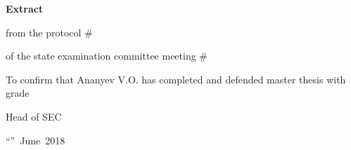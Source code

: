 \begin{titlepage}
    \fontsize{12}{12}\selectfont

    \vspace*{6cm}

    \begin{center}
        \textbf{Extract}

        from the protocol \#

        of the state examination committee meeting \#
    \end{center}

    \vspace{2cm}

    \noindent To confirm that Ananyev V.O. has completed and defended master thesis with grade 

    \vspace{2cm}

    \flushright

    Head of SEC 

    ``''~June~2018

\end{titlepage}
